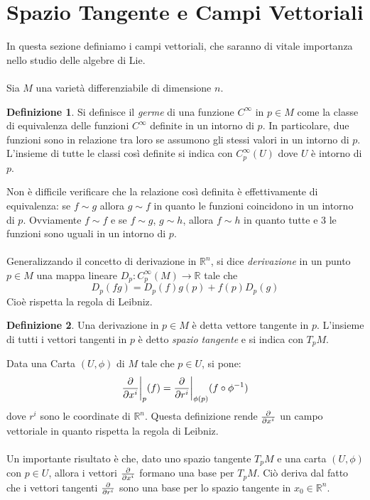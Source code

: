 \documentclass[12pt,a4paper]{report}
\theoremstyle{definition}
\newtheorem{Def}{Definizione}[chapter]
\theoremstyle{definition}
\theoremstyle{definition}
\theoremstyle{remark}
\begin{document}
\section{Spazio Tangente e Campi Vettoriali}
In questa sezione definiamo i campi vettoriali, che saranno di vitale importanza nello studio delle algebre di Lie.\\
\\
Sia $M$ una varietà differenziabile di dimensione $n$.
\begin{Def}
	Si definisce il \textit{germe} di una funzione $C^\infty$ in $p\in M$ come la classe di equivalenza delle funzioni $C^\infty$ definite in un intorno di $p$. In particolare, due funzioni sono in relazione tra loro se assumono gli stessi valori in un intorno di $p$.
	L'insieme di tutte le classi così definite si indica con $C_p^\infty(U)$ dove $U$ è intorno di $p$.
\end{Def}
Non è difficile verificare che la relazione così definita è effettivamente di equivalenza: se $f\sim g$ allora $g\sim f$ in quanto le funzioni coincidono in un intorno di $p$. Ovviamente $f\sim f$ e se $f\sim g$, $g\sim h$, allora $f\sim h$ in quanto tutte e 3 le funzioni sono uguali in un intorno di $p$.\\
\\
Generalizzando il concetto di derivazione in $\mathbb{R}^n$, si dice \textit{derivazione} in un punto $p\in M$ una mappa lineare $D_p:C^\infty_p(M)\rightarrow\mathbb{R}$ tale che $$D_p(fg)=D_p(f)g(p)+f(p)D_p(g)$$
Cioè rispetta la regola di Leibniz.
\begin{Def}
	Una derivazione in $p\in M$ è detta vettore tangente in $p$. L'insieme di tutti i vettori tangenti in $p$ è detto \textit{spazio tangente} e si indica con $T_pM$.
\end{Def} 
Data una Carta $(U,\phi)$ di $M$ tale che $p\in U$, si pone:
$${\partial\over \partial x^i}\bigg\rvert_p(f)={\partial\over \partial r^i}\bigg\rvert_{\phi(p)}(f\circ \phi^{-1})$$ dove $r^i$ sono le coordinate di $\mathbb{R}^n$.
Questa definizione rende ${\partial\over \partial x^i}$ un campo vettoriale in quanto rispetta la regola di Leibniz.\\
\\
Un importante risultato è che, dato uno spazio tangente $T_pM$ e una carta $(U,\phi)$ con $p\in U$, allora i vettori $\partial\over \partial x^i$ formano una base per $T_pM$. Ciò deriva dal fatto che i vettori tangenti $\partial\over \partial r^i$ sono una base per lo spazio tangente in $x_0\in\mathbb{R}^n$.\\
\end{document}
